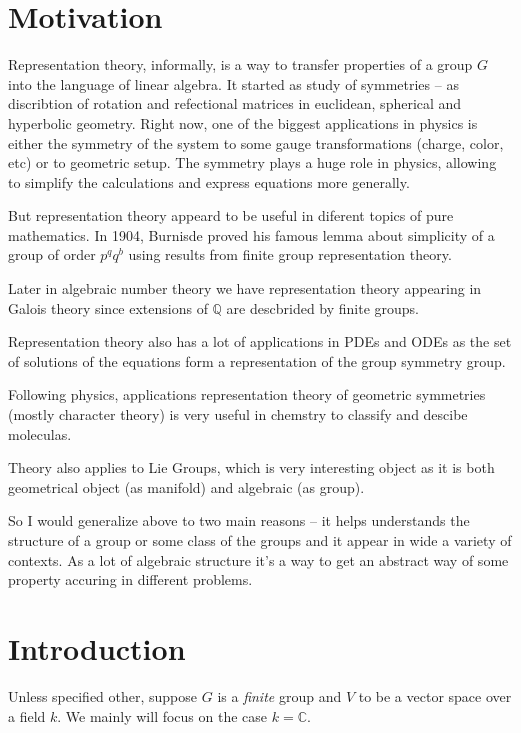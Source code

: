 \documentclass{amsart}
\author{M. Tikhonov}
\begin{document}
\newtheorem{definition}{Definition}
\newtheorem{note}{Note}
\newtheorem{lemma}{Lemma}

\section{Motivation}

Representation theory, informally, is a way to transfer properties of a group $G$  into the language of linear algebra. 
It started as study of symmetries -- as discribtion of rotation and refectional matrices in euclidean, spherical and hyperbolic geometry. 
Right now, one of the biggest applications in physics is either the symmetry of the system to some gauge transformations (charge, color, etc) or to geometric setup. 
The symmetry plays a huge role in physics, allowing to simplify the calculations and express equations more generally.

But representation theory appeard to be useful in diferent topics of pure mathematics.  
In 1904, Burnisde proved his famous lemma about simplicity of a group of order $p^q q^b$ using results from finite group representation theory.

Later in algebraic number theory we have representation theory appearing in Galois theory since extensions of $\mathbb{Q}$ are descbrided by finite groups.

Representation theory also has a lot of applications in PDEs and ODEs as the set of solutions of the equations form a representation of the group symmetry group.

Following physics, applications representation theory of geometric symmetries (mostly character theory) is very useful in chemstry to classify and descibe moleculas.

Theory also applies to Lie Groups, which is very interesting object as it is both geometrical object (as manifold) and algebraic (as group).

So I would generalize above to two main reasons -- it helps understands the structure of a group or some class of the groups and it appear in wide a variety of contexts.
As a lot of algebraic structure it's a way to get an abstract way of some property accuring in different problems.

\section{Introduction}
Unless specified other, suppose $G$ is a \textit{finite} group and $V$ to be a vector space over a field $k$. We mainly will focus on the case $k=\mathbb{C}$.
\end{document}
